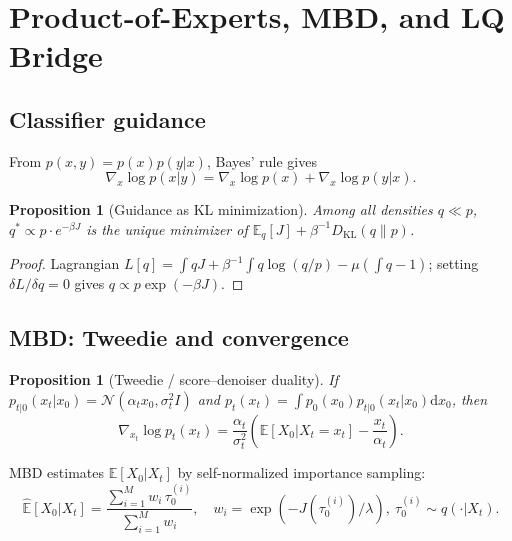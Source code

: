 \documentclass[11pt,letterpaper]{article}
\theoremstyle{plain}
\newtheorem{proposition}[theorem]{Proposition}
\theoremstyle{definition}
\theoremstyle{remark}
\newcommand{\E}{\mathbb{E}}
\newcommand{\dd}{\mathrm{d}}
\newcommand{\KL}{D_{\mathrm{KL}}}
\newcommand{\calN}{\mathcal{N}}
\newcommand{\grad}{\nabla}
\begin{document}
\section{Product-of-Experts, MBD, and LQ Bridge}\label{app:poe-mbd}

\subsection{Classifier guidance}

From $p(x,y)=p(x)p(y|x)$, Bayes' rule gives
\begin{equation}
  \grad_x\log p(x|y)=\grad_x\log p(x)+\grad_x\log p(y|x).
  \label{eq:cg}
\end{equation}

\begin{proposition}[Guidance as KL minimization]\label{prop:kl-guid}
Among all densities $q\ll p$, $q^*\propto p\cdot e^{-\beta J}$ is the unique
minimizer of $\E_q[J]+\beta^{-1}\KL(q\|p)$.
\end{proposition}
\begin{proof}
Lagrangian $L[q]=\int qJ+\beta^{-1}\int q\log(q/p)-\mu(\int q-1)$; setting
$\delta L/\delta q=0$ gives $q\propto p\exp(-\beta J)$.
\end{proof}

\subsection{MBD: Tweedie and convergence}

\begin{proposition}[Tweedie / score--denoiser duality]\label{prop:tweedie}
If $p_{t|0}(x_t|x_0)=\calN(\alpha_t x_0,\sigma_t^2 I)$ and
$p_t(x_t)=\int p_0(x_0)p_{t|0}(x_t|x_0)\dd x_0$, then
\begin{equation}
  \grad_{x_t}\log p_t(x_t)
  =\frac{\alpha_t}{\sigma_t^2}\!\left(\E[X_0|X_t=x_t]-\frac{x_t}{\alpha_t}\right).
  \label{eq:tweedie-app}
\end{equation}
\end{proposition}

MBD estimates $\E[X_0|X_t]$ by self-normalized importance sampling:
\begin{equation}
  \widehat{\E}[X_0|X_t]
  =\frac{\sum_{i=1}^M w_i\,\tau_0^{(i)}}{\sum_{i=1}^M w_i},\quad
  w_i=\exp(-J(\tau_0^{(i)})/\lambda),\ \tau_0^{(i)}\sim q(\cdot|X_t).
  \label{eq:mbd-sn}
\end{equation}
\end{document}
